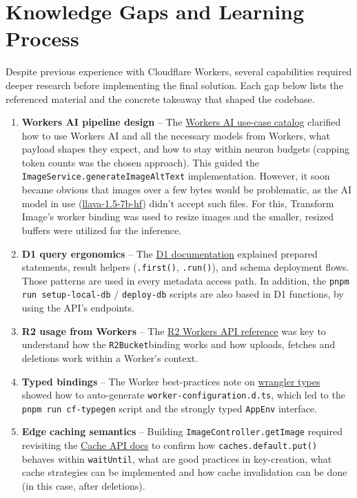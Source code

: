 \documentclass[12pt]{article}
\begin{document}
\section{Knowledge Gaps and Learning Process}
Despite previous experience with Cloudflare Workers, several capabilities required deeper research before implementing the final solution. Each gap below lists the referenced material and the concrete takeaway that shaped the codebase.
\begin{enumerate}[leftmargin=*]
  \item \textbf{Workers AI pipeline design} – The \href{https://developers.cloudflare.com/use-cases/ai/}{Workers AI use-case catalog} clarified how to use Workers AI and all the necessary models from Workers, what payload shapes they expect, and how to stay within neuron budgets (capping token counts was the chosen approach). This guided the \texttt{ImageService.generateImageAltText} implementation. However, it soon became obvious that images over a few bytes would be problematic, as the AI model in use (\href{https://developers.cloudflare.com/workers-ai/models/llava-1.5-7b-hf/}{llava-1.5-7b-hf}) didn't accept such files. For this, Transform Image's worker binding was used to resize images and the smaller, resized buffers were utilized for the inference.
  \item \textbf{D1 query ergonomics} – The \href{https://developers.cloudflare.com/d1/}{D1 documentation} explained prepared statements, result helpers (\texttt{.first()}, \texttt{.run()}), and schema deployment flows. Those patterns are used in every metadata access path. In addition, the \texttt{pnpm run setup-local-db} / \texttt{deploy-db} scripts are also based in D1 functions, by using the API's endpoints.
  \item \textbf{R2 usage from Workers} – The \href{https://developers.cloudflare.com/r2/api/workers/workers-api-usage/}{R2 Workers API reference} was key to understand how the \texttt{R2Bucket}binding works and how uploads, fetches and deletions work within a Worker's context.
  \item \textbf{Typed bindings} – The Worker best-practices note on \href{https://developers.cloudflare.com/workers/best-practices/workers-best-practices/#generate-binding-types-with-wrangler-types}{wrangler types} showed how to auto-generate \texttt{worker-configuration.d.ts}, which led to the \texttt{pnpm run cf-typegen} script and the strongly typed \texttt{AppEnv} interface.
  \item \textbf{Edge caching semantics} – Building \texttt{ImageController.getImage} required revisiting the \href{https://developers.cloudflare.com/workers/runtime-apis/cache/}{Cache API docs} to confirm how \texttt{caches.default.put()} behaves within \texttt{waitUntil}, what are good practices in key-creation, what cache strategies can be implemented and how cache invalidation can be done (in this case, after deletions).

\end{enumerate}
\end{document}
